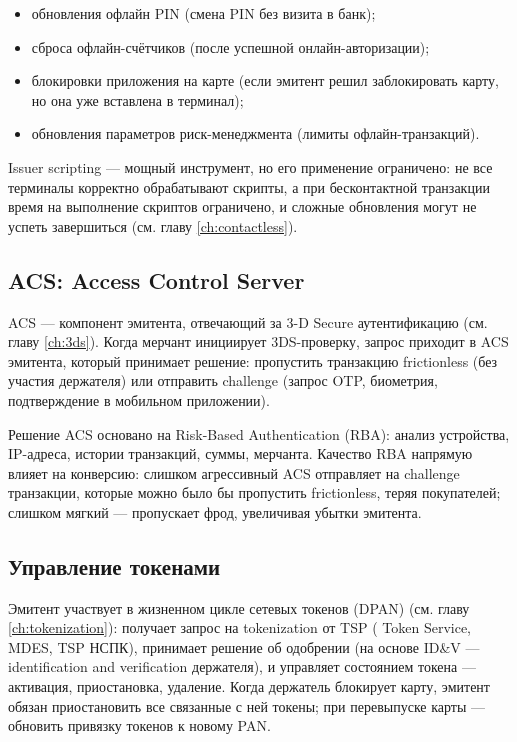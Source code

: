 \begin{itemize}
  \item обновления офлайн PIN (смена PIN без визита в банк);
  \item сброса офлайн-счётчиков (после успешной онлайн-авторизации);
  \item блокировки приложения на карте (если эмитент решил
        заблокировать карту, но она уже вставлена в терминал);
  \item обновления параметров риск-менеджмента (лимиты
        офлайн-транзакций).
\end{itemize}

Issuer scripting — мощный инструмент, но его применение ограничено: не все терминалы корректно обрабатывают скрипты, а
при бесконтактной транзакции время на выполнение скриптов ограничено, и сложные обновления могут не успеть завершиться
(см. главу \ref{ch:contactless}).

\subsection*{ACS: Access Control Server}

ACS — компонент эмитента, отвечающий за 3-D Secure аутентификацию (см. главу \ref{ch:3ds}). Когда мерчант инициирует
3DS-проверку, запрос приходит в ACS эмитента, который принимает решение: пропустить транзакцию frictionless (без
участия держателя) или отправить challenge (запрос OTP, биометрия, подтверждение в мобильном приложении).

Решение ACS основано на Risk-Based Authentication (RBA):
анализ устройства, IP-адреса, истории транзакций, суммы,
мерчанта. Качество RBA напрямую влияет на конверсию: слишком
агрессивный ACS отправляет на challenge транзакции, которые
можно было бы пропустить frictionless, теряя покупателей;
слишком мягкий — пропускает фрод, увеличивая убытки
эмитента.

\subsection*{Управление токенами}

Эмитент участвует в жизненном цикле сетевых токенов
(DPAN) (см. главу \ref{ch:tokenization}): получает запрос
на tokenization от TSP ( Token Service, MDES,
TSP НСПК), принимает решение об одобрении (на основе
ID\&V — identification and verification держателя),
и управляет состоянием токена — активация, приостановка,
удаление. Когда держатель блокирует карту, эмитент обязан
приостановить все связанные с ней токены; при перевыпуске
карты — обновить привязку токенов к новому PAN.

